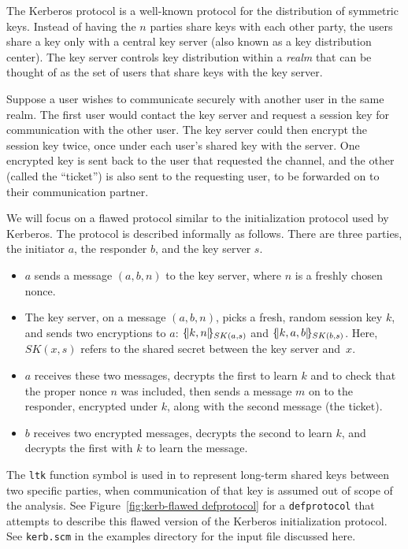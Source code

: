 The Kerberos protocol is a well-known protocol for the distribution of
symmetric keys.  Instead of having the $n$ parties share keys with
each other party, the users share a key only with a central key server
(also known as a key distribution center).  The key server controls
key distribution within a \emph{realm} that can be thought of as the
set of users that share keys with the key server.

Suppose a user wishes to communicate securely with another user in the
same realm.  The first user would contact the key server and request a
session key for communication with the other user.  The key server
could then encrypt the session key twice, once under each user's
shared key with the server.  One encrypted key is sent back to the
user that requested the channel, and the other (called the ``ticket'')
is also sent to the requesting user, to be forwarded on to their
communication partner.

We will focus on a flawed protocol similar to the initialization
protocol used by Kerberos.  The protocol is described informally as
follows.  There are three parties, the initiator $a$, the responder
$b$, and the key server $s$.

\begin{itemize}

\item $a$ sends a message $(a, b, n)$ to the key server, where $n$ is
  a freshly chosen nonce.

\item The key server, on a message $(a, b, n)$, picks a fresh, random
  session key $k$, and sends two encryptions to $a$:
  $\{\!|k,n|\!\}_{SK(a,s)}$ and $\{\!|k,a,b|\!\}_{SK(b,s)}$.  Here, $SK(x,s)$
  refers to the shared secret between the key server and~$x$.

\item $a$ receives these two messages, decrypts the first to learn $k$
  and to check that the proper nonce $n$ was included, then sends a
  message $m$ on to the responder, encrypted under $k$, along with the
  second message (the ticket).

\item $b$ receives two encrypted messages, decrypts the second to
  learn $k$, and decrypts the first with $k$ to learn the message.
\end{itemize}

 The \texttt{ltk} function symbol is used in {\cpsa} to
represent long-term shared keys between two specific parties, when
communication of that key is assumed out of scope of the analysis.
See Figure~\ref{fig:kerb-flawed defprotocol} for a
\texttt{defprotocol} that attempts to describe this flawed version of
the Kerberos initialization protocol.  See \texttt{kerb.scm} in the
examples directory for the input file discussed here.

